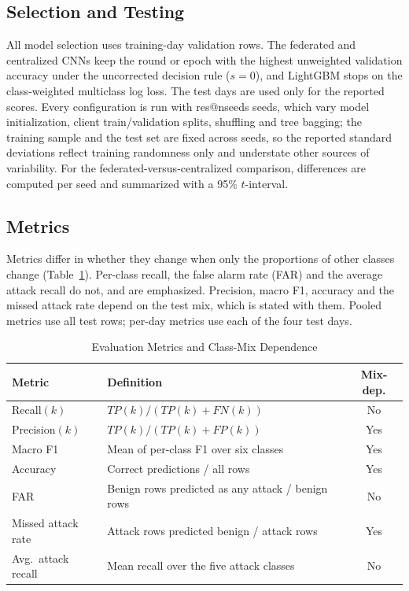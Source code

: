 \documentclass[conference]{IEEEtran}
\makeatletter
\providecommand{\R}[1]{\csname res@#1\endcsname}
\makeatother
\begin{document}
\subsection{Selection and Testing}
All model selection uses training-day validation rows. The federated and centralized CNNs keep the round or epoch with the highest unweighted validation accuracy under the uncorrected decision rule ($s=0$), and LightGBM stops on the class-weighted multiclass log loss. The test days are used only for the reported scores. Every configuration is run with \R{nseeds} seeds, which vary model initialization, client train/validation splits, shuffling and tree bagging; the training sample and the test set are fixed across seeds, so the reported standard deviations reflect training randomness only and understate other sources of variability. For the federated-versus-centralized comparison, differences are computed per seed and summarized with a 95\% $t$-interval.

\subsection{Metrics}
Metrics differ in whether they change when only the proportions of other classes change (Table~\ref{tab:metrics}). Per-class recall, the false alarm rate (FAR) and the average attack recall do not, and are emphasized. Precision, macro F1, accuracy and the missed attack rate depend on the test mix, which is stated with them. Pooled metrics use all test rows; per-day metrics use each of the four test days.

\begin{table}[!t]\caption{Evaluation Metrics and Class-Mix Dependence}\label{tab:metrics}\centering\footnotesize
\begin{tabularx}{\columnwidth}{l X c}\toprule Metric & Definition & Mix-dep. \\\midrule
Recall$(k)$ & $TP(k)/(TP(k)+FN(k))$ & No \\
Precision$(k)$ & $TP(k)/(TP(k)+FP(k))$ & Yes \\
Macro F1 & Mean of per-class F1 over six classes & Yes \\
Accuracy & Correct predictions / all rows & Yes \\
FAR & Benign rows predicted as any attack / benign rows & No \\
Missed attack rate & Attack rows predicted benign / attack rows & Yes \\
Avg.\ attack recall & Mean recall over the five attack classes & No \\
\bottomrule\end{tabularx}\end{table}
\end{document}
